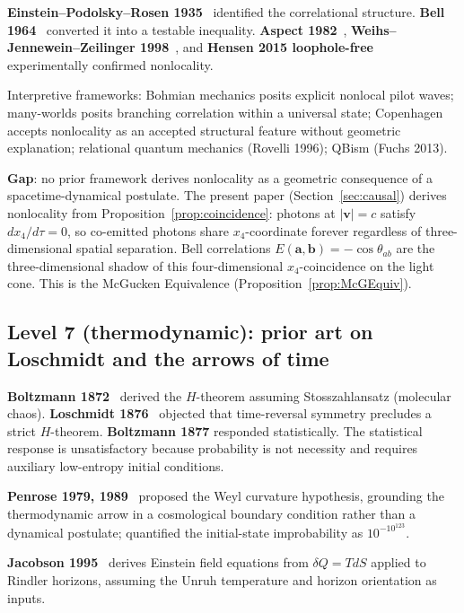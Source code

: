 \documentclass[11pt,a4paper]{article}
\begin{document}
\textbf{Einstein--Podolsky--Rosen 1935}~\cite{EPR1935} identified the correlational structure. \textbf{Bell 1964}~\cite{bell1964} converted it into a testable inequality. \textbf{Aspect 1982}~\cite{aspect1982}, \textbf{Weihs--Jennewein--Zeilinger 1998}~\cite{zeilinger1998}, and \textbf{Hensen 2015 loophole-free}~\cite{hensen2015} experimentally confirmed nonlocality.

Interpretive frameworks: Bohmian mechanics posits explicit nonlocal pilot waves; many-worlds posits branching correlation within a universal state; Copenhagen accepts nonlocality as an accepted structural feature without geometric explanation; relational quantum mechanics (Rovelli 1996); QBism (Fuchs 2013).

\textbf{Gap}: no prior framework derives nonlocality as a geometric consequence of a spacetime-dynamical postulate. The present paper (Section~\ref{sec:causal}) derives nonlocality from Proposition~\ref{prop:coincidence}: photons at $|\mathbf{v}| = c$ satisfy $dx_4/d\tau = 0$, so co-emitted photons share $x_4$-coordinate forever regardless of three-dimensional spatial separation. Bell correlations $E(\mathbf{a}, \mathbf{b}) = -\cos\theta_{ab}$ are the three-dimensional shadow of this four-dimensional $x_4$-coincidence on the light cone. This is the McGucken Equivalence (Proposition~\ref{prop:McGEquiv}).

\subsection{Level 7 (thermodynamic): prior art on Loschmidt and the arrows of time}

\textbf{Boltzmann 1872}~\cite{boltzmann1872} derived the $H$-theorem assuming Stosszahlansatz (molecular chaos). \textbf{Loschmidt 1876}~\cite{loschmidt1876} objected that time-reversal symmetry precludes a strict $H$-theorem. \textbf{Boltzmann 1877} responded statistically. The statistical response is unsatisfactory because probability is not necessity and requires auxiliary low-entropy initial conditions.

\textbf{Penrose 1979, 1989}~\cite{penrose1989} proposed the Weyl curvature hypothesis, grounding the thermodynamic arrow in a cosmological boundary condition rather than a dynamical postulate; quantified the initial-state improbability as $10^{-10^{123}}$.

\textbf{Jacobson 1995}~\cite{jacobson1995} derives Einstein field equations from $\delta Q = T dS$ applied to Rindler horizons, assuming the Unruh temperature and horizon orientation as inputs.
\end{document}
